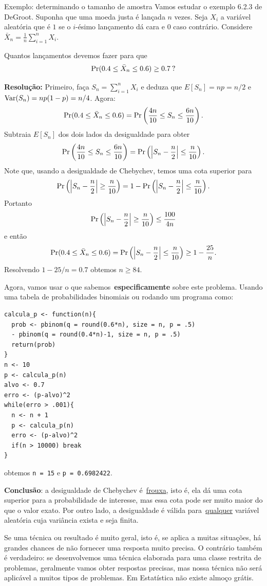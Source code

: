 \begin{frame}{Exemplo: determinando o tamanho de amostra}
Vamos estudar o exemplo 6.2.3 de DeGroot.
Suponha  que uma moeda justa é lançada $n$ vezes.
Seja $X_i$ a variável aleatória que é $1$ se o $i$-ésimo lançamento dá cara e $0$ caso contrário.
Considere $\bar{X}_n = \frac{1}{n} \sum_{i=1}^n X_i$.
\begin{pergunta}
Quantos lançamentos devemos fazer para que 
$$ \operatorname{Pr}(0.4 \leq \bar{X}_n \leq 0.6) \geq 0.7\: ?$$
\end{pergunta}
\textbf{Resolução:} Primeiro, faça $S_n = \sum_{i=1}^n X_i$ e deduza que $E[S_n] = np = n/2$ e $\operatorname{Var}(S_n) = n p(1-p) = n/4$.
Agora:
$$ \operatorname{Pr}(0.4 \leq \bar{X}_n \leq 0.6) = \operatorname{Pr}\left(\frac{4n}{10} \leq S_n  \leq \frac{6n}{10} \right).$$
Subtraia $E[S_n]$ dos dois lados da desigualdade para obter
$$ \operatorname{Pr}\left(\frac{4n}{10} \leq S_n  \leq \frac{6n}{10} \right) = \operatorname{Pr} \left(\left|S_n - \frac{n}{2} \right|\leq \frac{n}{10} \right) .$$
Note que, usando a desigualdade de Chebychev, temos uma cota superior para 
$$\operatorname{Pr} \left(\left|S_n - \frac{n}{2} \right|\geq \frac{n}{10} \right) = 1 - \operatorname{Pr} \left(\left|S_n - \frac{n}{2} \right|\leq \frac{n}{10} \right).$$
Portanto
$$\operatorname{Pr} \left(\left|S_n - \frac{n}{2} \right|\geq \frac{n}{10} \right) \leq \frac{100}{4n}$$ 
e então
$$ \operatorname{Pr}(0.4 \leq \bar{X}_n \leq 0.6) = \operatorname{Pr} \left(\left|S_n - \frac{n}{2} \right|\leq \frac{n}{10} \right) \geq 1 - \frac{25}{n}.$$
Resolvendo $ 1 - 25/n = 0.7$ obtemos $n \geq 84$.

\framebreak
Agora, vamos usar o que sabemos~\textbf{especificamente} sobre este problema.
Usando uma tabela de probabilidades binomiais ou rodando um programa como:
\begin{verbatim}
calcula_p <- function(n){
  prob <- pbinom(q = round(0.6*n), size = n, p = .5) 
  - pbinom(q = round(0.4*n)-1, size = n, p = .5)
  return(prob)
}
n <- 10
p <- calcula_p(n)
alvo <- 0.7
erro <- (p-alvo)^2
while(erro > .001){
  n <- n + 1
  p <- calcula_p(n)
  erro <- (p-alvo)^2
  if(n > 10000) break
}
\end{verbatim}
obtemos \verb|n = 15| e \verb|p = 0.6982422|.

\textbf{Conclusão}: a desigualdade de Chebychev é~\underline{frouxa}, isto é, ela dá uma cota superior para a probabilidade de interesse, mas essa cota pode ser muito maior do que o valor exato.
Por outro lado, a desigualdade é válida para~\underline{qualquer} variável aleatória cuja variância exista e seja finita.

\begin{ideia}
\label{idea:no_free_lunch}
 Se uma técnica ou resultado é muito geral, isto é, se aplica a muitas situações, há grandes chances de não fornecer uma resposta muito precisa.
 O contrário também é verdadeiro: se desenvolvemos uma técnica elaborada para uma classe restrita de problemas, geralmente vamos obter respostas precisas, mas nossa técnica não será aplicável a muitos tipos de problemas.
 Em Estatística não existe almoço grátis.
\end{ideia}

\end{frame}
